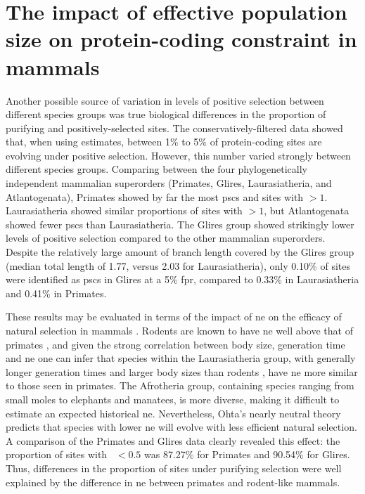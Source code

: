 
\section{The impact of effective population size on protein-coding constraint in mammals}

Another possible source of variation in levels of positive selection
between different species groups was true biological differences in
the proportion of purifying and positively-selected sites. The
conservatively-filtered \sw data showed that, when using \omgml
estimates, between 1\% to 5\% of protein-coding sites are evolving
under positive selection. However, this number varied strongly between
different species groups. Comparing between the four phylogenetically
independent mammalian superorders (Primates, Glires, Laurasiatheria,
and Atlantogenata), Primates showed by far the most \acp{psc} and
sites with \omgml$>1$. Laurasiatheria showed similar proportions of
sites with \omgml$>1$, but Atlantogenata showed fewer \acp{psc} than
Laurasiatheria. The Glires group showed strikingly lower levels of
positive selection compared to the other mammalian
superorders. Despite the relatively large amount of branch length
covered by the Glires group (median total length of 1.77, versus 2.03
for Laurasiatheria), only 0.10\% of sites were identified as \acp{psc}
in Glires at a 5\% \ac{fpr}, compared to 0.33\% in Laurasiatheria and
0.41\% in Primates.

These results may be evaluated in terms of the impact of \ac{ne} on
the efficacy of natural selection in mammals
\citep{Popadin2007,Nikolaev2007,Ellegren2009}. Rodents are known to
have \ac{ne} well above that of primates \citep{Kosiol2008}, and given
the strong correlation between body size, generation time and \ac{ne}
\citep{Nikolaev2007} one can infer that species within the
Laurasiatheria group, with generally longer generation times and
larger body sizes than rodents \citep{Hou2009}, have \ac{ne} more
similar to those seen in primates. The Afrotheria group, containing
species ranging from small moles to elephants and manatees, is more
diverse, making it difficult to estimate an expected historical
\ac{ne}. Nevertheless, Ohta's nearly neutral theory \citep{Ohta1992}
predicts that species with lower \ac{ne} will evolve with less
efficient natural selection. A comparison of the Primates and Glires
data clearly revealed this effect: the proportion of sites with
\omgml~$<0.5$ was 87.27\% for Primates and 90.54\% for Glires. Thus,
differences in the proportion of sites under purifying selection were
well explained by the difference in \ac{ne} between primates and
rodent-like mammals.

